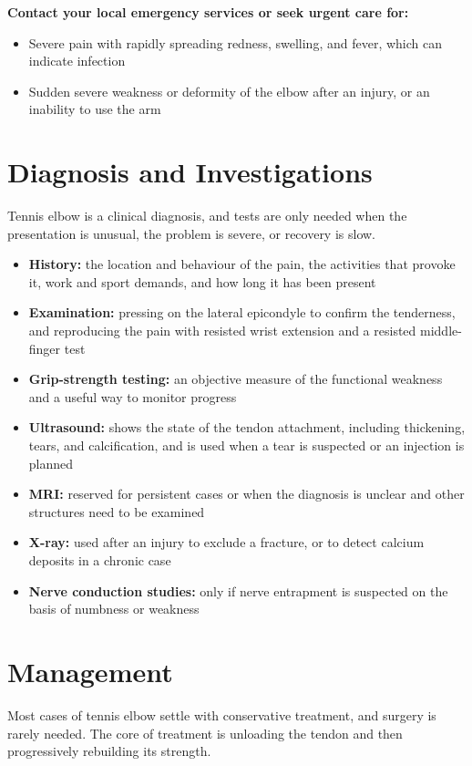 \textbf{Contact your local emergency services or seek urgent care for:}
\begin{itemize}
    \item Severe pain with rapidly spreading redness, swelling, and fever, which can indicate infection
    \item Sudden severe weakness or deformity of the elbow after an injury, or an inability to use the arm
\end{itemize}

\section*{Diagnosis and Investigations}
Tennis elbow is a clinical diagnosis, and tests are only needed when the presentation is unusual, the problem is severe, or recovery is slow.

\begin{itemize}
    \item \textbf{History:} the location and behaviour of the pain, the activities that provoke it, work and sport demands, and how long it has been present
    \item \textbf{Examination:} pressing on the lateral epicondyle to confirm the tenderness, and reproducing the pain with resisted wrist extension and a resisted middle-finger test
    \item \textbf{Grip-strength testing:} an objective measure of the functional weakness and a useful way to monitor progress
    \item \textbf{Ultrasound:} shows the state of the tendon attachment, including thickening, tears, and calcification, and is used when a tear is suspected or an injection is planned
    \item \textbf{MRI:} reserved for persistent cases or when the diagnosis is unclear and other structures need to be examined
    \item \textbf{X-ray:} used after an injury to exclude a fracture, or to detect calcium deposits in a chronic case
    \item \textbf{Nerve conduction studies:} only if nerve entrapment is suspected on the basis of numbness or weakness
\end{itemize}

\section*{Management}
Most cases of tennis elbow settle with conservative treatment, and surgery is rarely needed. The core of treatment is unloading the tendon and then progressively rebuilding its strength.

